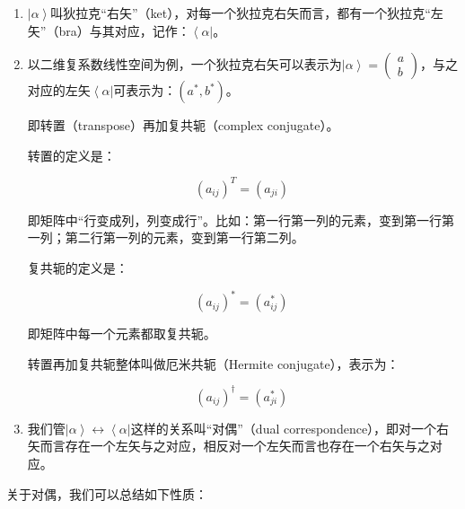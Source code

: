 \begin{enumerate}
\item 

$\left| \alpha \right\rangle$叫狄拉克“右矢”（ket），对每一个狄拉克右矢而言，都有一个狄拉克“左矢”（bra）与其对应，记作：$\left\langle \alpha \right|$。

\item

以二维复系数线性空间为例，一个狄拉克右矢可以表示为$\left| \alpha \right\rangle = \left( \begin{array}{ccc} a \\ b \end{array}  \right)$，与之对应的左矢$ \left\langle \alpha \right| $可表示为：$\left( a^* , b^*  \right)$。

即转置（transpose）再加复共轭（complex conjugate）。

转置的定义是：

\begin{equation}
\left( a_{ij}  \right)^T = \left( a_{ji} \right)~
\end{equation}

即矩阵中“行变成列，列变成行”。比如：第一行第一列的元素，变到第一行第一列；第二行第一列的元素，变到第一行第二列。

复共轭的定义是：

\begin{equation}
\left( a_{ij}  \right)^* = \left( a_{ij}^* \right)~
\end{equation}

即矩阵中每一个元素都取复共轭。

转置再加复共轭整体叫做厄米共轭（Hermite conjugate），表示为：

\begin{equation}
\left( a_{ij}  \right)^{\dagger} = \left( a_{ji}^* \right)~
\end{equation}

\item

我们管$\left| \alpha \right\rangle  \leftrightarrow  \left\langle \alpha \right|$这样的关系叫“对偶”（dual correspondence），即对一个右矢而言存在一个左矢与之对应，相反对一个左矢而言也存在一个右矢与之对应。

\end{enumerate}

关于对偶，我们可以总结如下性质：

